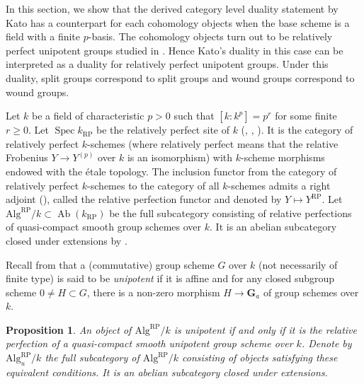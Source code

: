 \documentclass{amsart}
\newtheorem{Prop}[Thm]{Proposition}
\theoremstyle{remark}
\numberwithin{equation}{section}
\newcommand{\Ga}{\mathbf{G}_{a}}
\newcommand{\Alg}{\mathrm{Alg}}
\newcommand{\RP}{\mathrm{RP}}
\DeclareMathOperator{\Spec}{Spec}
\DeclareMathOperator{\Ab}{Ab}
\begin{document}
In this section, we show that
the derived category level duality statement by Kato \cite[Theorem 4.3 (ii)]{Kat86}
has a counterpart for each cohomology objects
when the base scheme is a field with a finite $p$-basis.
The cohomology objects turn out to be relatively perfect unipotent groups
studied in \cite[Section 8]{BS20}.
Hence Kato's duality in this case can be interpreted
as a duality for relatively perfect unipotent groups.
Under this duality, split groups correspond to split groups
and wound groups correspond to wound groups.

Let $k$ be a field of characteristic $p > 0$
such that $[k : k^{p}] = p^{r}$ for some finite $r \ge 0$.
Let $\Spec k_{\RP}$ be the relatively perfect site of $k$
(\cite[Section 2]{Kat86}, \cite[Section 2]{KS19}, \cite[Definition 8.2]{BS20}).
It is the category of relatively perfect $k$-schemes
(where relatively perfect means that
the relative Frobenius $Y \to Y^{(p)}$ over $k$ is an isomorphism)
with $k$-scheme morphisms endowed with the \'etale topology.
The inclusion functor from the category of relatively perfect $k$-schemes
to the category of all $k$-schemes admits a right adjoint (\cite[Definition 1.8]{Kat86}),
called the relative perfection functor and denoted by $Y \mapsto Y^{\RP}$.
Let $\Alg^{\RP} / k \subset \Ab(k_{\RP})$ be the full subcategory
consisting of relative perfections of quasi-compact smooth group schemes over $k$.
It is an abelian subcategory closed under extensions
by \cite[Propositions 8.7 and 8.12]{BS20}.

Recall from \cite[Chapter IV, Section 2, Definition 2.1]{DG70b} that
a (commutative) group scheme $G$ over $k$ (not necessarily of finite type)
is said to be \emph{unipotent}
if it is affine and for any closed subgroup scheme $0 \ne H \subset G$,
there is a non-zero morphism $H \to \Ga$ of group schemes over $k$.

\begin{Prop}
	An object of $\Alg^{\RP} / k$ is unipotent
	if and only if it is the relative perfection of a quasi-compact smooth unipotent group scheme over $k$.
	Denote by $\Alg^{\RP}_{u} / k$ the full subcategory of $\Alg^{\RP} / k$
	consisting of objects satisfying these equivalent conditions.
	It is an abelian subcategory closed under extensions.
\end{Prop}
\end{document}
